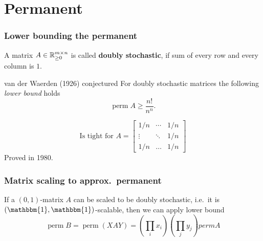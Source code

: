 \documentclass{beamer}
\DeclareMathOperator*{\perm}{perm}
\begin{document}
\section{Permanent}%
\label{sec:}

\begin{frame}
  \frametitle{Lower bounding the permanent}
  \begin{definition}
    A matrix $A \in \mathbb{R}^{m\times n}_{\ge0}$ is called \textbf{doubly stochastic}, if sum of every row and every column is $1$.
  \end{definition}

  \begin{block}{van der Waerden (1926) conjectured}
    For doubly stochastic matrices the following \emph{lower bound} holds
    \begin{equation}
      \perm A \ge \frac{n!}{n^n}.
    \end{equation}
  \end{block}
  \begin{equation}
   \text{Is tight for } A = \begin{bmatrix}
      1/n & \cdots & 1/n \\
      \vdots & \ddots & 1/n \\
      1/n & \dots & 1/n
    \end{bmatrix}
  \end{equation}
  Proved in 1980.
\end{frame}


\begin{frame}
  \frametitle{Matrix scaling to approx.\ permanent}
  \begin{block}{}
    If a $(0, 1)$-matrix $A$ can be scaled to be doubly stochastic, i.e.\ it is $\left(\mathbbm{1}, \mathbbm{1}\right)$-scalable, then
    we can apply lower bound
    \begin{equation}
      \perm B = \perm (XAY) = \left(\prod_i x_i\right) \left(\prod_j y_j\right) perm A
    \end{equation}
  \end{block}
\end{frame}
\end{document}

